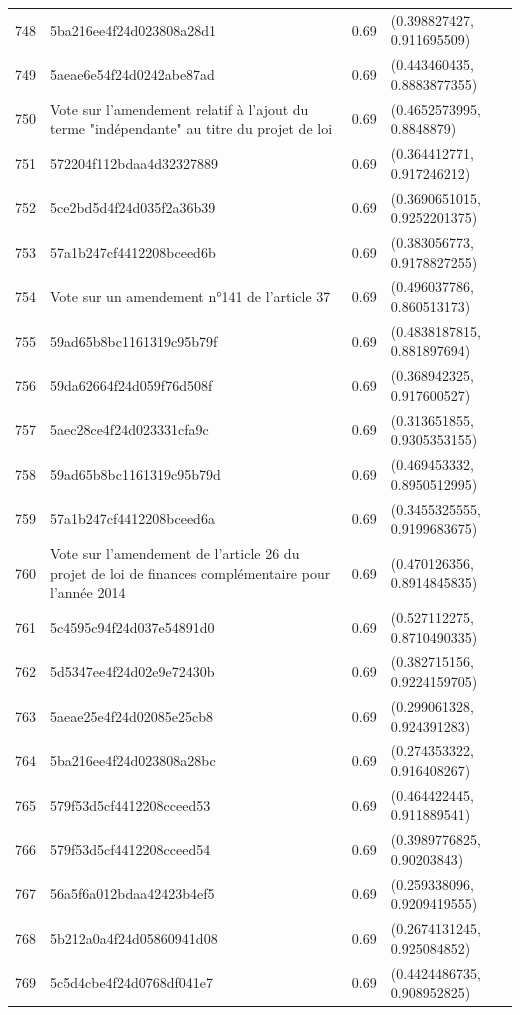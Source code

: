 \begin{table}[ht]
\begin{tabular}{rlrl}
  748 & 5ba216ee4f24d023808a28d1 & 0.69 & (0.398827427, 0.911695509) \\ 
  749 & 5aeae6e54f24d0242abe87ad & 0.69 & (0.443460435, 0.8883877355) \\ 
  750 & Vote sur l'amendement relatif à l'ajout du terme "indépendante" au titre du projet de loi & 0.69 & (0.4652573995, 0.8848879) \\ 
  751 & 572204f112bdaa4d32327889 & 0.69 & (0.364412771, 0.917246212) \\ 
  752 & 5ce2bd5d4f24d035f2a36b39 & 0.69 & (0.3690651015, 0.9252201375) \\ 
  753 & 57a1b247cf4412208bceed6b & 0.69 & (0.383056773, 0.9178827255) \\ 
  754 & Vote sur un amendement n°141 de l'article 37 & 0.69 & (0.496037786, 0.860513173) \\ 
  755 & 59ad65b8bc1161319c95b79f & 0.69 & (0.4838187815, 0.881897694) \\ 
  756 & 59da62664f24d059f76d508f & 0.69 & (0.368942325, 0.917600527) \\ 
  757 & 5aec28ce4f24d023331cfa9c & 0.69 & (0.313651855, 0.9305353155) \\ 
  758 & 59ad65b8bc1161319c95b79d & 0.69 & (0.469453332, 0.8950512995) \\ 
  759 & 57a1b247cf4412208bceed6a & 0.69 & (0.3455325555, 0.9199683675) \\ 
  760 & Vote sur l'amendement de l'article 26 du projet de loi de finances complémentaire pour l'année 2014 & 0.69 & (0.470126356, 0.8914845835) \\ 
  761 & 5c4595c94f24d037e54891d0 & 0.69 & (0.527112275, 0.8710490335) \\ 
  762 & 5d5347ee4f24d02e9e72430b & 0.69 & (0.382715156, 0.9224159705) \\ 
  763 & 5aeae25e4f24d02085e25cb8 & 0.69 & (0.299061328, 0.924391283) \\ 
  764 & 5ba216ee4f24d023808a28bc & 0.69 & (0.274353322, 0.916408267) \\ 
  765 & 579f53d5cf4412208cceed53 & 0.69 & (0.464422445, 0.911889541) \\ 
  766 & 579f53d5cf4412208cceed54 & 0.69 & (0.3989776825, 0.90203843) \\ 
  767 & 56a5f6a012bdaa42423b4ef5 & 0.69 & (0.259338096, 0.9209419555) \\ 
  768 & 5b212a0a4f24d05860941d08 & 0.69 & (0.2674131245, 0.925084852) \\ 
  769 & 5c5d4cbe4f24d0768df041e7 & 0.69 & (0.4424486735, 0.908952825) \\ 

\end{tabular}
\end{table}
